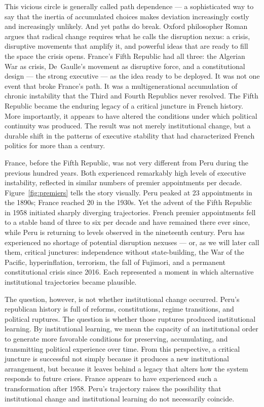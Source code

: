 \documentclass[doc, 12pt, a4paper,floatsintext]{apa7}
\begin{document}
This vicious circle is generally called path dependence --- a sophisticated way to say that the inertia of accumulated choices makes deviation increasingly costly and increasingly unlikely. And yet paths do break. Oxford philosopher Roman \textcite{krznaric_how_2024} argues that radical change requires what he calls the disruption nexus: a crisis, disruptive movements that amplify it, and powerful ideas that are ready to fill the space the crisis opens. France's Fifth Republic had all three: the Algerian War as crisis, De~Gaulle's movement as disruptive force, and a constitutional design --- the strong executive --- as the idea ready to be deployed. It was not one event that broke France's path. It was a multigenerational accumulation of chronic instability that the Third and Fourth Republics never resolved. The Fifth Republic became the enduring legacy of a critical juncture in French history. More importantly, it appears to have altered the conditions under which political continuity was produced. The result was not merely institutional change, but a durable shift in the patterns of executive stability that had characterized French politics for more than a century.



France, before the Fifth Republic, was not very different from Peru during the previous hundred years. Both experienced remarkably high levels of executive instability, reflected in similar numbers of premier appointments per decade. Figure~\ref{fig:premiers} tells the story visually. Peru peaked at 23 appointments in the 1890s; France reached 20 in the 1930s. Yet the advent of the Fifth Republic in 1958 initiated sharply diverging trajectories. French premier appointments fell to a stable band of three to six per decade and have remained there ever since, while Peru is returning to levels observed in the nineteenth century. Peru has experienced no shortage of potential disruption nexuses --- or, as we will later call them, critical junctures: independence without state-building, the War of the Pacific, hyperinflation, terrorism, the fall of Fujimori, and a permanent constitutional crisis since 2016. Each represented a moment in which alternative institutional trajectories became plausible.

The question, however, is not whether institutional change occurred. Peru's republican history is full of reforms, constitutions, regime transitions, and political ruptures. The question is whether those ruptures produced institutional learning. By institutional learning, we mean the capacity of an institutional order to generate more favorable conditions for preserving, accumulating, and transmitting political experience over time. From this perspective, a critical juncture is successful not simply because it produces a new institutional arrangement, but because it leaves behind a legacy that alters how the system responds to future crises. France appears to have experienced such a transformation after 1958. Peru's trajectory raises the possibility that institutional change and institutional learning do not necessarily coincide.
\end{document}
